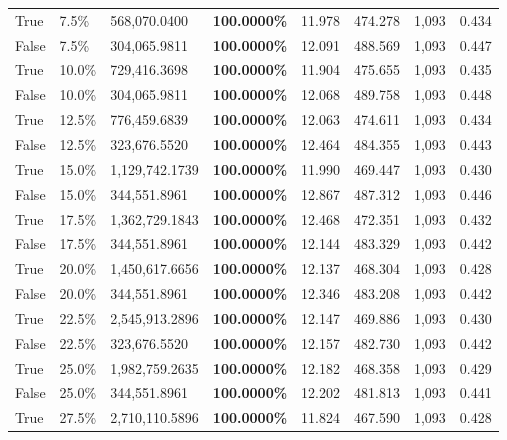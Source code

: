 \begin{table}[H]
\begin{tabular}{lllrllll}
\cline{1-8}
True & 7.5\% & 568,070.0400 & \bfseries \color{red} 100.0000\% & 11.978 & 474.278 & 1,093 & 0.434 \\
\cline{1-8}
False & 7.5\% & \color{red} 304,065.9811 & \bfseries \color{red} 100.0000\% & 12.091 & 488.569 & 1,093 & 0.447 \\
\cline{1-8}
True & 10.0\% & 729,416.3698 & \bfseries \color{red} 100.0000\% & 11.904 & 475.655 & 1,093 & 0.435 \\
\cline{1-8}
False & 10.0\% & \color{red} 304,065.9811 & \bfseries \color{red} 100.0000\% & 12.068 & 489.758 & 1,093 & 0.448 \\
\cline{1-8}
True & 12.5\% & 776,459.6839 & \bfseries \color{red} 100.0000\% & 12.063 & 474.611 & 1,093 & 0.434 \\
\cline{1-8}
False & 12.5\% & 323,676.5520 & \bfseries \color{red} 100.0000\% & 12.464 & 484.355 & 1,093 & 0.443 \\
\cline{1-8}
True & 15.0\% & 1,129,742.1739 & \bfseries \color{red} 100.0000\% & 11.990 & 469.447 & 1,093 & 0.430 \\
\cline{1-8}
False & 15.0\% & 344,551.8961 & \bfseries \color{red} 100.0000\% & 12.867 & 487.312 & 1,093 & 0.446 \\
\cline{1-8}
True & 17.5\% & 1,362,729.1843 & \bfseries \color{red} 100.0000\% & 12.468 & 472.351 & 1,093 & 0.432 \\
\cline{1-8}
False & 17.5\% & 344,551.8961 & \bfseries \color{red} 100.0000\% & 12.144 & 483.329 & 1,093 & 0.442 \\
\cline{1-8}
True & 20.0\% & 1,450,617.6656 & \bfseries \color{red} 100.0000\% & 12.137 & 468.304 & 1,093 & 0.428 \\
\cline{1-8}
False & 20.0\% & 344,551.8961 & \bfseries \color{red} 100.0000\% & 12.346 & 483.208 & 1,093 & 0.442 \\
\cline{1-8}
True & 22.5\% & 2,545,913.2896 & \bfseries \color{red} 100.0000\% & 12.147 & 469.886 & 1,093 & 0.430 \\
\cline{1-8}
False & 22.5\% & 323,676.5520 & \bfseries \color{red} 100.0000\% & 12.157 & 482.730 & 1,093 & 0.442 \\
\cline{1-8}
True & 25.0\% & 1,982,759.2635 & \bfseries \color{red} 100.0000\% & 12.182 & 468.358 & 1,093 & 0.429 \\
\cline{1-8}
False & 25.0\% & 344,551.8961 & \bfseries \color{red} 100.0000\% & 12.202 & 481.813 & 1,093 & 0.441 \\
\cline{1-8}
True & 27.5\% & 2,710,110.5896 & \bfseries \color{red} 100.0000\% & 11.824 & 467.590 & 1,093 & 0.428 \\

\end{tabular}
\end{table}
